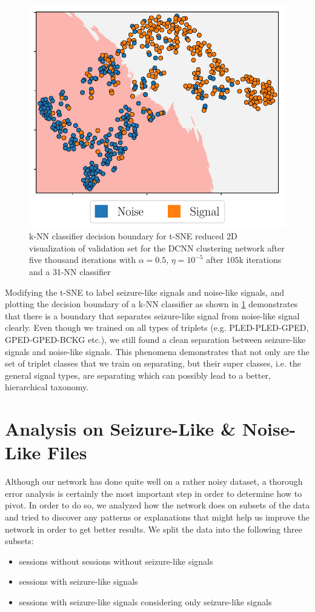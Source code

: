 \begin{figure}[!ht]
	\centering
	\includegraphics[width=0.55\linewidth]{pictures/tsne_plot_binary.pdf}
	\caption[k-NN Binary Decision Boundary on t-SNE Reduced Embedding]{k-NN classifier decision boundary for t-SNE reduced 2D visualization of validation set for the DCNN clustering network after five thousand iterations with $\alpha = 0.5$, $\eta = 10^{-5}$ after $105$k iterations and a 31-NN classifier}\label{fig:tsne_plot_binary}  
\end{figure}

Modifying the t-SNE to label seizure-like signals and noise-like signals, and plotting the decision boundary of a k-NN classifier as shown in \cref{fig:tsne_plot_binary} demonstrates that there is a boundary that separates seizure-like signal from noise-like signal clearly. Even though we trained on all types of triplets (e.g. PLED-PLED-GPED, GPED-GPED-BCKG etc.), we still found a clean separation between seizure-like signals and noise-like signals. This phenomena demonstrates that not only are the set of triplet classes that we train on separating, but their super classes, i.e. the general signal types, are separating which can possibly lead to a better, hierarchical taxonomy. 



\section{Analysis on Seizure-Like \& Noise-Like Files}
\label{analysis}
Although our network has done quite well on a rather noisy dataset, a thorough error analysis is certainly the most important step in order to determine how to pivot. In order to do so, we analyzed how the network does on subsets of the data and tried to discover any patterns or explanations that might help us improve the network in order to get better results. We split the data into the following three subsets: 
\begin{itemize}
	\setlength\itemsep{1mm}
	\item sessions without sessions without seizure-like signals
	\item sessions with seizure-like signals
	\item sessions with seizure-like signals considering only seizure-like signals
\end{itemize}
   
